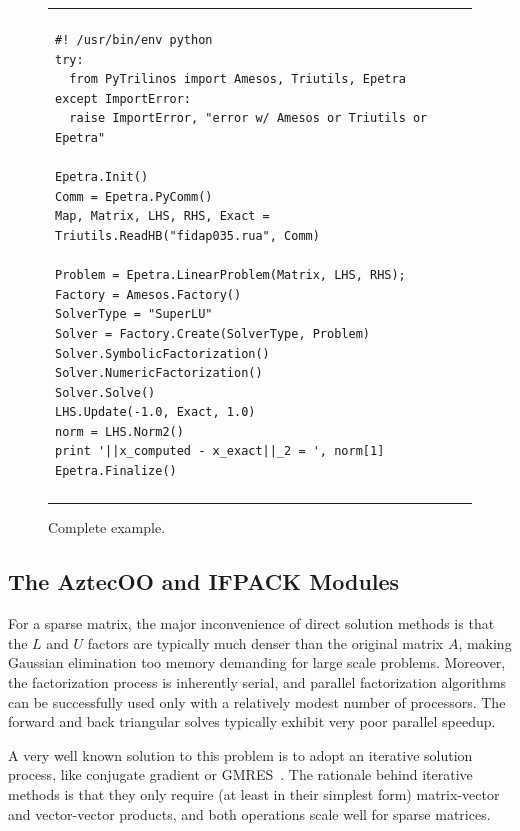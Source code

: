 \documentclass[10pt,relax]{SANDreport}
\begin{document}
\begin{figure}
\begin{center}
\begin{tabular}{| p{12cm} |}
\hline
\\
\footnotesize
\begin{minipage}{11.5cm}
\begin{verbatim}
#! /usr/bin/env python
try:
  from PyTrilinos import Amesos, Triutils, Epetra
except ImportError:
  raise ImportError, "error w/ Amesos or Triutils or Epetra"

Epetra.Init()
Comm = Epetra.PyComm()
Map, Matrix, LHS, RHS, Exact = Triutils.ReadHB("fidap035.rua", Comm)

Problem = Epetra.LinearProblem(Matrix, LHS, RHS);
Factory = Amesos.Factory()
SolverType = "SuperLU"
Solver = Factory.Create(SolverType, Problem)
Solver.SymbolicFactorization()
Solver.NumericFactorization()
Solver.Solve()
LHS.Update(-1.0, Exact, 1.0)
norm = LHS.Norm2()
print '||x_computed - x_exact||_2 = ', norm[1]
Epetra.Finalize()
\end{verbatim}
\end{minipage}
\\
\\
\hline
\end{tabular}
\caption{Complete example.}
\label{fig:amesos}
\end{center}
\end{figure}

\subsection{The AztecOO and IFPACK Modules}
\label{subsec:aztecoo_ifpack}

For a sparse matrix, the major inconvenience of direct solution
methods is that the $L$ and $U$ factors are typically much denser than
the original matrix $A$, making Gaussian elimination too memory
demanding for large scale problems. Moreover, the factorization
process is inherently serial, and parallel factorization algorithms
can be successfully used only with a relatively modest number of
processors. The forward and back triangular solves typically exhibit
very poor parallel speedup.

A very well known solution to this problem is to adopt an iterative
solution process, like conjugate gradient or GMRES~\cite{golub96matrix}. The
rationale behind iterative methods is that they only require (at least
in their simplest form) matrix-vector and vector-vector products, and
both operations scale well for sparse matrices.
\end{document}
